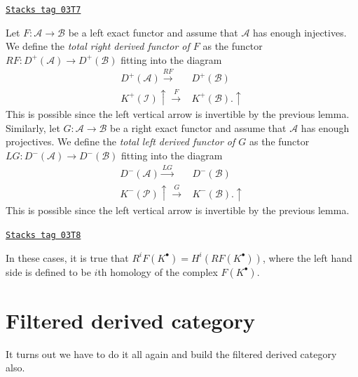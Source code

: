 \begin{definition}
\label{trace-definition-derived-functor}
\href{https://stacks.math.columbia.edu/tag/03T7}{\texttt{Stacks tag 03T7}}

Let $F: \mathcal{A} \to \mathcal{B}$ be a left exact functor and assume that
$\mathcal{A}$ has enough injectives. We define the {\it total right derived
functor of $F$} as the functor $RF: D^+(\mathcal{A}) \to D^+(\mathcal{B})$
fitting into the diagram
$$
\begin{array}{cc}D^+(\mathcal{A}) \overset{RF}{\longrightarrow} & D^+(\mathcal{B}) \\ K^+(\mathcal I) \uparrow\overset{F}{\longrightarrow} & K^+(\mathcal{B}). \uparrow\end{array}
$$
This is possible since the left vertical arrow is invertible by the previous
lemma. Similarly, let $G: \mathcal{A} \to \mathcal{B}$ be a right exact
functor and assume that $\mathcal{A}$ has enough projectives. We define the
{\it total left derived functor of $G$} as the functor $LG: D^-(\mathcal{A})
\to D^-(\mathcal{B})$ fitting into the diagram
$$
\begin{array}{cc}D^-(\mathcal{A}) \overset{LG}{\longrightarrow} & D^-(\mathcal{B}) \\ K^-(\mathcal{P}) \uparrow\overset{G}{\longrightarrow} & K^-(\mathcal{B}). \uparrow\end{array}
$$
This is possible since the left vertical arrow is invertible by the previous
lemma.
\end{definition}

\begin{remark}
\label{trace-remark-cohomology-of-derived-functor}
\href{https://stacks.math.columbia.edu/tag/03T8}{\texttt{Stacks tag 03T8}}

In these cases, it is true that $R^iF(K^\bullet) = H^i(RF(K^\bullet))$, where
the left hand side is defined to be $i$th homology of the complex
$F(K^\bullet)$.
\end{remark}

\section{Filtered derived category}
\label{trace-section-filtered-derived-category}
It turns out we have to do it all again and build the filtered derived
category also.

